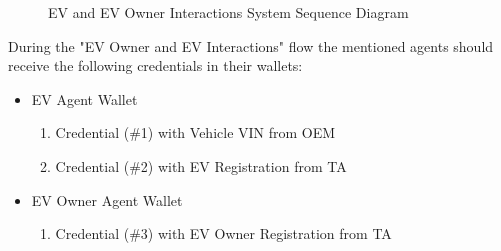 \begin{figure}[!]
    \centering
    \caption{EV and EV Owner Interactions System Sequence Diagram}
    \label{fig:ev_and_ev_owner_interactions_ssd}
\end{figure}

During the "EV Owner and EV Interactions" flow the mentioned agents should receive the following credentials in their wallets:

\begin{itemize}
    \item EV Agent Wallet
    \begin{enumerate}
        \item Credential (\#1) with Vehicle VIN from OEM
        \item Credential (\#2) with EV Registration from TA 
    \end{enumerate}
    \item EV Owner Agent Wallet 
    \begin{enumerate}
        \item Credential (\#3) with EV Owner Registration from TA
    \end{enumerate}
\end{itemize}

